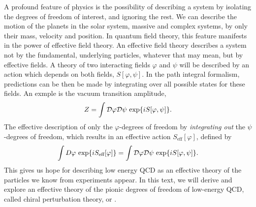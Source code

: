 A profound feature of physics is the possibility of describing a system by isolating the degrees of freedom of interest, and ignoring the rest.
We can describe the motion of the planets in the solar system, massive and complex systems, by only their mass, velocity and position.
In quantum field theory, this feature manifests in the power of effective field theory.
An effective field theory describes a system not by the fundamental, underlying particles, whatever that may mean, but by effective fields.
A theory of two interacting fields $\varphi$ and $\psi$ will be described by an action which depends on both fields, $S[\varphi, \psi]$.
In the path integral formalism, predictions can be then be made by integrating over all possible states for these fields.
An exmple is the vacuum transition amplitude,
\begin{equation}
    Z = \int \mathcal{D} \varphi \mathcal{D} \psi \, \exp{i S[\varphi, \psi]}.
\end{equation}
The effective description of only the $\varphi$-degrees of freedom by \emph{integrating out} the $\psi$-degrees of freedom, which results in an effective action $S_\text{eff}[\varphi]$, defined by~\cite{Schwartz:QFT}
\begin{equation}
    \label{integrating out degrees of freedom}
    \int D \varphi \, \exp{i S_\text{eff}[\varphi]} 
    =
    \int \mathcal{D} \varphi \mathcal{D} \psi \, \exp{i S[\varphi, \psi]}.
\end{equation}
This gives us hope for describing low energy QCD as an effective theory of the particles we know from experiments appear.
In this text, we will derive and explore an effective theory of the pionic degrees of freedom of low-energy QCD, called chiral perturbation theory, or \chpt.

